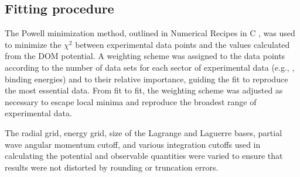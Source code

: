 \subsection{Fitting procedure}
The Powell minimization method, outlined in Numerical Recipes in C \cite{NumericalRecipes},
was used to minimize the $\chi^{2}$ between experimental data points and the
values calculated from the DOM potential. A weighting scheme was assigned to the data points
according to the number of data sets for each sector of experimental data (e.g., \el,
binding energies) and to their relative importance, guiding the fit to reproduce
the most essential data. From fit to fit, the weighting scheme was adjusted
as necessary to escape local minima and reproduce the broadest range of experimental data.

The radial grid, energy grid, size of the Lagrange and Laguerre bases,
partial wave angular momentum cutoff,
and various integration cutoffs used in calculating the potential and
observable quantities were varied to ensure that results were not 
distorted by rounding or truncation errors.
\afterpage{\clearpage}

